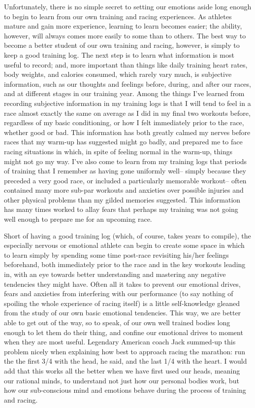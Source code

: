 Unfortunately, there is no simple secret to setting our emotions aside long enough to begin to learn from our own training and racing experiences. As athletes mature and gain more experience, learning to learn becomes easier; the ability, however, will always comes more easily to some than to others. The best way to become a better student of our own training and racing, however, is simply to keep a good training log. The next step is to learn what information is most useful to record; and, more important than things like daily training heart rates, body weights, and calories consumed, which rarely vary much, is subjective information, such as our thoughts and feelings before, during, and after our races, and at different stages in our training year. Among the things I've learned from recording subjective information in my training logs is that I will tend to feel in a race almost exactly the same on average as I did in my final two workouts before, regardless of my basic conditioning, or how I felt immediately prior to the race, whether good or bad. This information has both greatly calmed my nerves before races that my warm-up has suggested might go badly, and prepared me to face racing situations in which, in spite of feeling normal in the warm-up, things might not go my way. I've also come to learn from my training logs that periods of training that I remember as having gone uniformly well-- simply because they preceded a very good race, or included a particularly memorable workout-- often contained many more sub-par workouts and anxieties over possible injuries and other physical problems than my gilded memories suggested. This information has many times worked to allay fears that perhaps my training was not going well enough to prepare me for an upcoming race.

Short of having a good training log (which, of course, takes years to compile), the especially nervous or emotional athlete can begin to create some space in which to learn simply by spending some time post-race revisiting his/her feelings beforehand, both immediately prior to the race and in the key workouts leading in, with an eye towards better understanding and mastering any negative tendencies they might have. Often all it takes to prevent our emotional drives, fears and anxieties from interfering with our performance (to say nothing of spoiling the whole experience of racing itself) is a little self-knowledge gleaned from the study of our own basic emotional tendencies. This way, we are better able to get out of the way, so to speak, of our own well trained bodies long enough to let them do their thing, and confine our emotional drives to moment when they are most useful. Legendary American coach Jack summed-up this problem nicely when explaining how best to approach racing the marathon: run the the first 3/4 with the head, he said, and the last 1/4 with the heart. I would add that this works all the better when we have first used our heads, meaning our rational minds, to understand not just how our personal bodies work, but how our sub-conscious mind and emotions behave during the process of training and racing.
